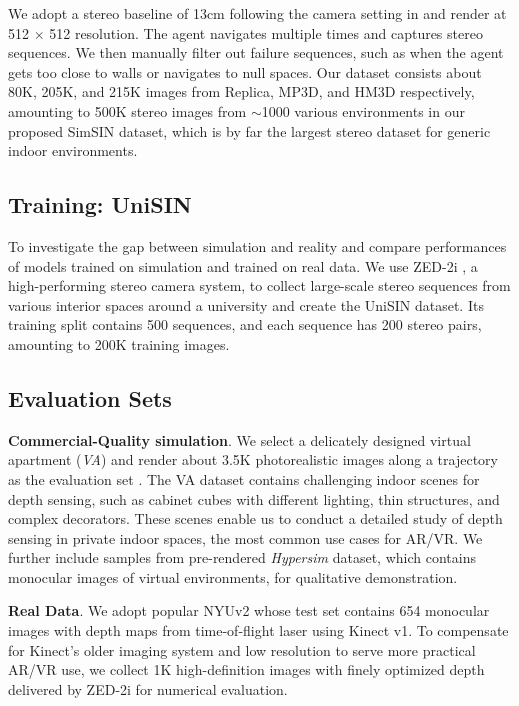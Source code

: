 \documentclass[10pt,twocolumn,letterpaper]{article}
\begin{document}
We adopt a stereo baseline of 13cm following the camera setting in \cite{chabra2019stereodrnet} and render at 512 $\times$ 512 resolution. The agent navigates multiple times and captures stereo sequences. We then manually filter out failure sequences, such as when the agent gets too close to walls or navigates to null spaces. Our dataset consists about 80K, 205K, and 215K images from Replica, MP3D, and HM3D respectively, amounting to 500K stereo images from $\sim$1000 various environments in our proposed SimSIN dataset, which is by far the largest stereo dataset for generic indoor environments.

\subsection{Training: UniSIN}
\label{sec:UniSIN}
To investigate the gap between simulation and reality and compare performances of models trained on simulation and trained on real data. We use ZED-2i \cite{ZED2i}, a high-performing stereo camera system, to collect large-scale stereo sequences from various interior spaces around a university and create the UniSIN dataset. Its training split contains 500 sequences, and each sequence has 200 stereo pairs, amounting to 200K training images.

\subsection{Evaluation Sets}
\label{sec:evaluation}
\textbf{Commercial-Quality simulation}. We select a delicately designed virtual apartment (\textit{VA}) and render about 3.5K photorealistic images along a trajectory as the evaluation set \cite{UnrealEngine4, UE4Environment}. The VA dataset contains challenging indoor scenes for depth sensing, such as cabinet cubes with different lighting, thin structures, and complex decorators. These scenes enable us to conduct a detailed study of depth sensing in private indoor spaces, the most common use cases for AR/VR. We further include samples from pre-rendered \textit{Hypersim} \cite{roberts2020hypersim} dataset, which contains monocular images of virtual environments, for qualitative demonstration.

\textbf{Real Data}.
We adopt popular NYUv2 \cite{silberman2012indoor} whose test set contains 654 monocular images with depth maps from time-of-flight laser using Kinect v1. To compensate for Kinect's older imaging system and low resolution to serve more practical AR/VR use, we collect 1K high-definition images with finely optimized depth delivered by ZED-2i for numerical evaluation.
\end{document}
